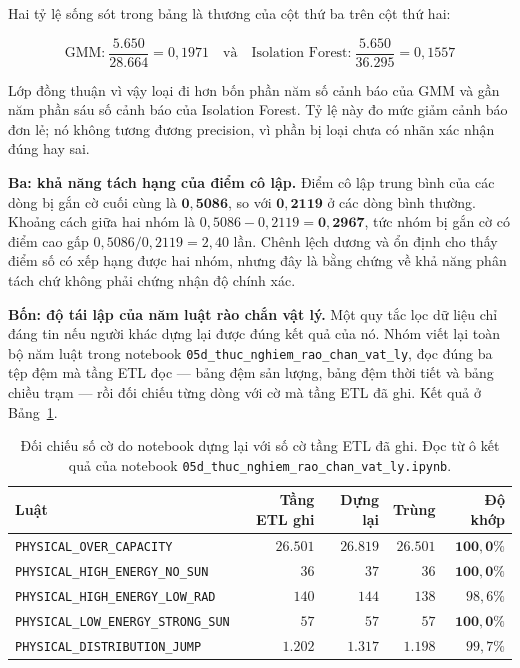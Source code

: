 \documentclass[12pt, a4paper]{report}
\begin{document}
Hai tỷ lệ sống sót trong bảng là thương của cột thứ ba trên cột thứ hai:

\begin{equation}
\text{GMM:}\ \frac{5.650}{28.664} = 0{,}1971 \quad\text{và}\quad
\text{Isolation Forest:}\ \frac{5.650}{36.295} = 0{,}1557
\end{equation}

Lớp đồng thuận vì vậy loại đi hơn bốn phần năm số cảnh báo của GMM và gần năm phần sáu số
cảnh báo của Isolation Forest. Tỷ lệ này đo mức giảm cảnh báo đơn lẻ; nó không tương
đương precision, vì phần bị loại chưa có nhãn xác nhận đúng hay sai.

\textbf{Ba: khả năng tách hạng của điểm cô lập.} Điểm cô lập trung bình của các dòng bị
gắn cờ cuối cùng là $\mathbf{0{,}5086}$, so với $\mathbf{0{,}2119}$ ở các dòng bình thường.
Khoảng cách giữa hai nhóm là $0{,}5086 - 0{,}2119 = \mathbf{0{,}2967}$, tức nhóm bị gắn cờ có
điểm cao gấp $0{,}5086 / 0{,}2119 = 2{,}40$ lần. Chênh lệch dương và ổn định cho thấy điểm số
có xếp hạng được hai nhóm, nhưng đây là bằng chứng về khả năng phân tách chứ không phải chứng
nhận độ chính xác.

\textbf{Bốn: độ tái lập của năm luật rào chắn vật lý.} Một quy tắc lọc dữ liệu chỉ đáng
tin nếu người khác dựng lại được đúng kết quả của nó. Nhóm viết lại toàn bộ năm luật trong
notebook \texttt{05d\_thuc\_nghiem\_rao\_chan\_vat\_ly}, đọc đúng ba tệp đệm mà tầng ETL đọc --- bảng
đệm sản lượng, bảng đệm thời tiết và bảng chiều trạm --- rồi đối chiếu từng dòng với cờ mà
tầng ETL đã ghi. Kết quả ở Bảng~\ref{tab:tai_lap_luat}.

\begin{table}[htbp]
\centering
\caption{Đối chiếu số cờ do notebook dựng lại với số cờ tầng ETL đã ghi. Đọc từ ô kết quả
của notebook \texttt{05d\_thuc\_nghiem\_rao\_chan\_vat\_ly.ipynb}.}
\label{tab:tai_lap_luat}
\small
\begin{tabular}{l r r r r}
\toprule
\textbf{Luật} & \textbf{Tầng ETL ghi} & \textbf{Dựng lại} & \textbf{Trùng} & \textbf{Độ khớp} \\
\midrule
\texttt{PHYSICAL\_OVER\_CAPACITY}          & $26.501$ & $26.819$ & $26.501$ & $\mathbf{100{,}0\%}$ \\
\texttt{PHYSICAL\_HIGH\_ENERGY\_NO\_SUN}   & $36$     & $37$     & $36$     & $\mathbf{100{,}0\%}$ \\
\texttt{PHYSICAL\_HIGH\_ENERGY\_LOW\_RAD}  & $140$    & $144$    & $138$    & $98{,}6\%$ \\
\texttt{PHYSICAL\_LOW\_ENERGY\_STRONG\_SUN}& $57$     & $57$     & $57$     & $\mathbf{100{,}0\%}$ \\
\texttt{PHYSICAL\_DISTRIBUTION\_JUMP}      & $1.202$  & $1.317$  & $1.198$  & $99{,}7\%$ \\
\bottomrule
\end{tabular}
\end{table}
\end{document}
